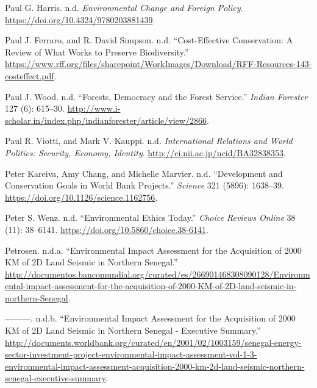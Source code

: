 \begin{CSLReferences}{1}{0}
Paul G. Harris. n.d. \emph{Environmental Change and Foreign Policy}.
\url{https://doi.org/10.4324/9780203881439}.

Paul J. Ferraro, and R. David Simpson. n.d. {``Cost-Effective
Conservation: A Review of What Works to Preserve Biodiversity.''}
\url{https://www.rff.org/files/sharepoint/WorkImages/Download/RFF-Resources-143-costeffect.pdf}.

Paul J. Wood. n.d. {``Forests, Democracy and the Forest Service.''}
\emph{Indian Forester} 127 (6): 615--30.
\url{http://www.i-scholar.in/index.php/indianforester/article/view/2866}.

Paul R. Viotti, and Mark V. Kauppi. n.d. \emph{International Relations
and World Politics: Security, Economy, Identity}.
\url{http://ci.nii.ac.jp/ncid/BA32838353}.

Peter Kareiva, Amy Chang, and Michelle Marvier. n.d. {``Development and
Conservation Goals in World Bank Projects.''} \emph{Science} 321 (5896):
1638--39. \url{https://doi.org/10.1126/science.1162756}.

Peter S. Wenz. n.d. {``Environmental Ethics Today.''} \emph{Choice
Reviews Online} 38 (11): 38--6141.
\url{https://doi.org/10.5860/choice.38-6141}.

Petrosen. n.d.a. {``Environmental Impact Assessment for the Acquisition
of 2000 KM of 2D Land Seismic in Northern Senegal.''}
\url{http://documentos.bancomundial.org/curated/es/266901468308090128/Environmental-impact-assessment-for-the-acquisition-of-2000-KM-of-2D-land-seismic-in-northern-Senegal}.

---------. n.d.b. {``Environmental Impact Assessment for the Acquisition
of 2000 KM of 2D Land Seismic in Northern Senegal - Executive
Summary.''}
\url{http://documents.worldbank.org/curated/en/2001/02/1003159/senegal-energy-sector-investment-project-environmental-impact-assessment-vol-1-3-environmental-impact-assessment-acquisition-2000-km-2d-land-seismic-northern-senegal-executive-summary}.


\end{CSLReferences}
